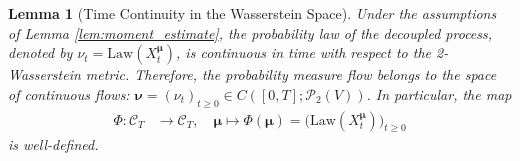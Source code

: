 \documentclass[12pt]{amsart}
\numberwithin{equation}{section}
\newtheorem{lemma}[theorem]{Lemma}
\begin{document}
\begin{lemma}[Time Continuity in the Wasserstein Space]
\label{lem:time_continuity}
Under the assumptions of Lemma \ref{lem:moment_estimate}, the probability law of the decoupled process, denoted by $\nu_t = \mathrm{Law}(X^{\bm{\mu}}_t)$, is continuous in time with respect to the 2-Wasserstein metric. Therefore, the probability measure flow belongs to the space of continuous flows: $\bm{\nu}=(\nu_t)_{t\geq0} \in C([0,T]; \mathscr{P}_2(V))$. 
In particular, the map 
\begin{equation*}
\begin{aligned}
    \Phi: \mathscr{C}_T & \longrightarrow \mathscr{C}_T,\quad \bm{\mu}  \longmapsto \Phi(\bm{\mu})=\big(\mathrm{Law}(X^{\bm{\mu}}_t)\big)_{t\geq 0}
\end{aligned}
\end{equation*}
is well-defined.
\end{lemma}
\end{document}
